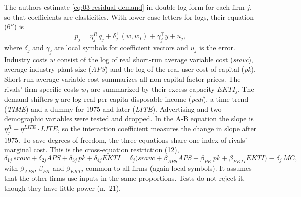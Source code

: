  The authors estimate \eqref{eq:03-residual-demand} in double-log form for
each firm $j$, so that coefficients are elasticities. With lower-case letters for logs, their equation
(6$''$) is
\begin{equation}\label{eq:03-bb-estimating}
  p_j = \eta^R_j\, q_j + \delta_j^\top (w, w_I) + \gamma_j^\top y + u_j ,
\end{equation}
where $\delta_j$ and $\gamma_j$ are local symbols for coefficient vectors and $u_j$ is the error. Industry
costs $w$ consist of the log of real short-run average variable cost (\textit{sravc}), average industry plant
size (\textit{APS}) and the log of the real user cost of capital (\textit{pk}). Short-run average variable cost
summarizes all non-capital factor prices. The rivals' firm-specific costs $w_I$ are summarized by their excess capacity
$\mathit{EKTI}_j$. The demand shifters $y$ are log real per capita disposable income (\textit{pcdi}), a
time trend (\textit{TIME}) and a dummy for 1975 and later (\textit{LITE}). Advertising and two demographic
variables were tested and dropped. In the A-B equation the slope is $\eta^R_j + \eta^{LITE}\cdot \mathit{LITE}$, so the
interaction coefficient measures the change in slope after 1975. To save degrees of freedom, the three
equations share one index of rivals' marginal cost. This is the cross-equation restriction (12),
\begin{equation}\label{eq:03-bb-restriction}
  \delta_{1j}\, \mathit{sravc} + \delta_{2j}\mathit{APS} + \delta_{3j}\, \mathit{pk} + \delta_{4j}\mathit{EKTI}
  = \delta_j\bigl(\mathit{sravc} + \beta_{APS}\mathit{APS} + \beta_{PK}\, \mathit{pk} +
  \beta_{EKTI}\mathit{EKTI}\bigr) \equiv \delta_j\, \mathit{MC},
\end{equation}
with $\beta_{APS}$, $\beta_{PK}$ and $\beta_{EKTI}$ common to all firms (again local symbols). It assumes that
the other firms use inputs in the same proportions. Tests do not reject it, though they have little power
(n.~21).

